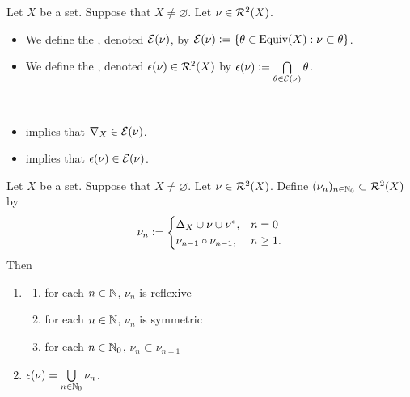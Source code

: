 \begin{defn}
	Let $X$ be a set. Suppose that $X \neq \varnothing$. Let $\nu \in \mathcal{R}^2(X)$. 
	\begin{itemize}
		\item We define the , denoted $\mathcal{E}(\nu)$, by $\mathcal{E}(\nu) \vcentcolon= \{\theta \in \operatorname*{\text{Equiv}}(X): \nu \subset \theta \}$. 
		\item We define the , denoted $\epsilon(\nu) \in \mathcal{R}^2(X)$ by $\epsilon(\nu) \vcentcolon= \bigcap\limits_{\theta \in \mathcal{E}(\nu)} \theta$. 
	\end{itemize}
\end{defn}

\begin{note}\
	\begin{itemize}
		\item {} implies that $\operatorname{\nabla}_X \in \mathcal{E}(\nu)$.
		\item {} implies that $\epsilon(\nu) \in \mathcal{E}(\nu)$.
	\end{itemize}
\end{note}

\begin{ex}
	Let $X$ be a set. Suppose that $X \neq \varnothing$. Let $\nu \in \mathcal{R}^2(X)$. Define $(\nu_n)_{n \in \mathbb{N}_0} \subset \mathcal{R}^2(X)$ by 
	\[
	\nu_n \vcentcolon= 
	\begin{cases}
		\Delta_X \cup \nu \cup \nu^*, & n = 0 \\
		\nu_{n-1} \circ \nu_{n-1}, & n \geq 1.
	\end{cases}
	\] 
	Then 
	\begin{enumerate}
		\item 
		\begin{enumerate}
			\item for each $n \in \mathbb{N}$, $\nu_n$ is reflexive
			\item for each $n \in \mathbb{N}$, $\nu_n$ is symmetric
			\item for each $n \in \mathbb{N}_0$, $\nu_n \subset \nu_{n+1}$
		\end{enumerate}
		\item $\epsilon(\nu) = \bigcup\limits_{n \in \mathbb{N}_0} \nu_n$.
	\end{enumerate}
\end{ex}

